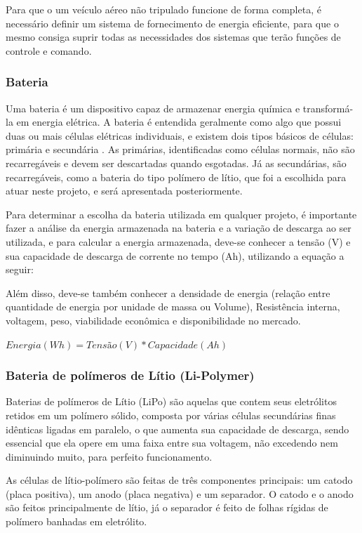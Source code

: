 
Para que o um veículo aéreo não tripulado funcione de forma completa, é necessário definir um sistema de fornecimento de energia eficiente, para que o mesmo consiga suprir todas as necessidades dos sistemas que terão funções de controle e comando.

\subsubsection{Bateria}

Uma bateria é um dispositivo capaz de armazenar energia química e transformá-la em energia elétrica. A bateria é entendida geralmente como algo que possui duas ou mais células elétricas individuais, e existem dois tipos básicos de células: primária e secundária \cite{gibbs}. As primárias, identificadas como células normais, não são recarregáveis e devem ser descartadas quando esgotadas. Já as secundárias, são recarregáveis, como a bateria do tipo polímero de lítio, que foi a escolhida para atuar neste projeto, e será apresentada posteriormente. 

Para determinar a escolha da bateria utilizada em qualquer projeto, é importante fazer a análise  da energia armazenada na bateria e a variação de descarga ao ser utilizada, e para calcular a energia armazenada, deve-se conhecer a tensão (V) e sua capacidade de descarga de corrente no tempo (Ah), utilizando a equação a seguir: \cite{peixoto}

Além disso, deve-se também conhecer a densidade de energia (relação entre quantidade de energia por unidade de massa ou Volume), Resistência interna, voltagem, peso, viabilidade econômica e disponibilidade no mercado.

$Energia(Wh)= Tensão(V)*Capacidade(Ah)$

\subsubsection{Bateria de polímeros de Lítio (Li-Polymer)}

Baterias de polímeros de Lítio (LiPo) são aquelas que contem seus eletrólitos retidos em um polímero sólido, 
composta por várias células secundárias finas idênticas ligadas em paralelo, o que aumenta sua capacidade de 
descarga, sendo essencial que ela opere em uma faixa entre sua voltagem, não excedendo nem diminuindo muito, para perfeito funcionamento. \cite{gibbs}

As células de lítio-polímero são feitas de três componentes principais: um catodo (placa positiva), um anodo 
(placa negativa) e um separador. O catodo e o anodo são feitos principalmente de lítio, já o separador é feito 
de folhas rígidas de polímero banhadas em eletrólito. \cite{gibbs}

